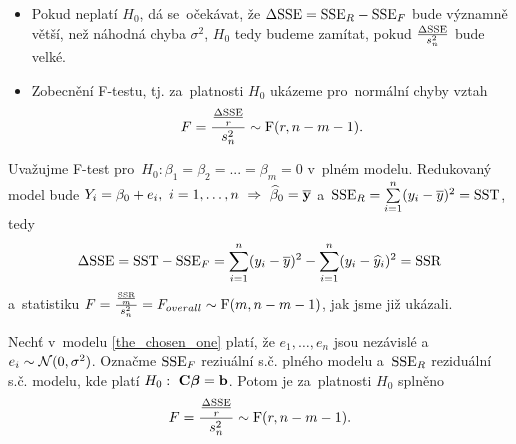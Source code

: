 \begin{itemize}
	\item Pokud neplatí $H_0$, dá se~očekávat, že $\Delta\mathrm{SSE} = \mathrm{SSE}_R-\mathrm{SSE}_F$ bude významně větší, než náhodná chyba $\sigma^2$, $H_0$ tedy budeme zamítat, pokud $\frac{\Delta\mathrm{SSE}}{s_n^2}$ bude velké.
	\item Zobecnění F-testu, tj. za~platnosti $H_0$ ukázeme pro~normální chyby vztah
	 $$ F = \frac{\frac{\Delta\mathrm{SSE}}{r}}{s_n^2}\sim\mathrm{F}(r,n-m-1). $$
\end{itemize}
\begin{example}
	Uvažujme F-test pro~$H_0:\beta_1 = \beta_2 = ... = \beta_m = 0$ v~plném modelu. Redukovaný model bude $Y_i = \beta_0+e_i,~i = 1,\dots,n~\Rightarrow~\widehat{\beta}_0 = \overline{\mathbf{y}}$ a~$\mathrm{SSE}_R = \sum\limits_{i=1}^{n} (y_i-\overline{y})^2 = \mathrm{SST}$, tedy
	 $$ \Delta \mathrm{SSE} = \mathrm{SST}-\mathrm{SSE}_F = \sum\limits_{i=1}^{n} (y_i-\overline{y})^2-\sum\limits_{i=1}^{n} (y_i-\widehat{y}_i)^2 = \mathrm{SSR} $$
	 a~statistiku $F = \frac{\frac{\mathrm{SSR}}{m}}{s_n^2} = F_{overall}\sim\mathrm{F}(m,n-m-1)$, jak jsme již ukázali.
\end{example}
\begin{theorem}
	Nechť v~modelu \eqref{the_chosen_one} platí, že $e_1,\dots,e_n$ jsou nezávislé a~$e_i\sim\mathcal{N}(0,\sigma^2)$. Označme $\mathrm{SSE}_F$ reziuální s.č. plného modelu a~$\mathrm{SSE}_R$ reziduální s.č. modelu, kde platí $H_0:~\textbf{C}\boldsymbol{\beta} = \textbf{b}$. Potom je za~platnosti $H_0$ splněno
	 $$ F = \frac{\frac{\Delta\mathrm{SSE}}{r}}{s_n^2}\sim\mathrm{F}(r,n-m-1). $$
\end{theorem}
